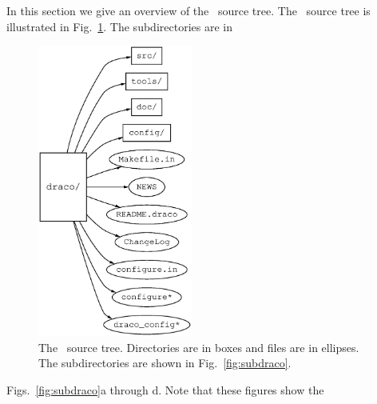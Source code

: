 In this section we give an overview of the \draco\ source tree. The
\draco\ source tree is illustrated in Fig.~\ref{fig:src_draco}.  The
subdirectories are in
\begin{figure}
  \centerline{\includegraphics[width=2in]{fig/src_draco.eps}}
  \caption{The \draco\ source tree.  Directories are in boxes and
    files are in ellipses.  The subdirectories are shown in
    Fig.~\ref{fig:subdraco}.}
  \label{fig:src_draco}
\end{figure}
Figs.~\ref{fig:subdraco}a through d.  Note that these figures show the
